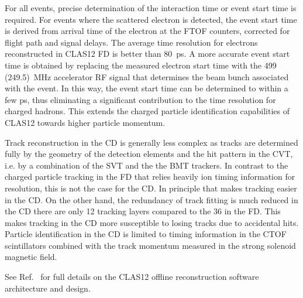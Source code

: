 \documentclass[final,3p,twocolumn]{elsarticle}
\begin{document}
For all events, precise determination of the interaction time or event start time is required. For events where the
scattered electron is detected, the event start time is derived from arrival time of the electron at the FTOF counters, 
corrected for flight path and signal delays.  The average time resolution for electrons reconstructed in CLAS12 FD is
better than 80~ps. A more accurate event start time is obtained by replacing the measured electron start time with the
499 (249.5)~MHz accelerator RF signal that determines the beam bunch associated with the event. In this way, the event
start time can be determined to within a few ps, thus eliminating a significant contribution to the time resolution for
charged hadrons. This extends the charged particle identification capabilities of CLAS12 towards higher particle
momentum.

Track reconstruction in the CD is generally less complex as tracks are determined fully by the geometry of the 
detection elements and the hit pattern in the CVT, i.e. by a combination of the SVT and the the BMT trackers. 
In contrast to the charged particle tracking in the FD that relies heavily ion timing information for resolution, 
this is not the case for the CD. In principle that makes tracking easier in the CD. On the other hand, the redundancy 
of track fitting is much reduced in the CD there are only 12 tracking layers compared to the 36 in the FD. This 
makes tracking in the CD more susceptible to losing tracks due to accidental hits. Particle identification in the CD is
limited to timing information in the CTOF scintillators combined with the track momentum measured in the strong solenoid 
magnetic field.  

See Ref.~\cite{Software} for full details on the CLAS12 offline reconstruction software architecture and design.
\end{document}
